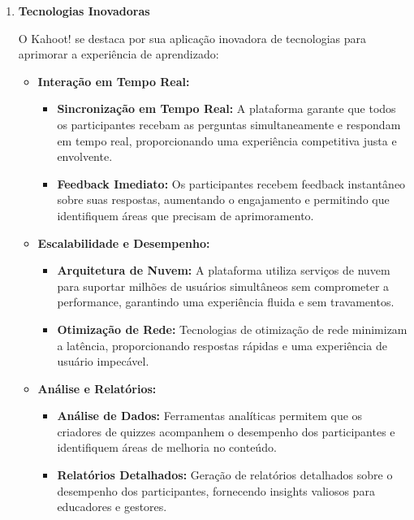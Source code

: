 \begin{enumerate}
    \item \textbf{Tecnologias Inovadoras}
    
    O Kahoot! se destaca por sua aplicação inovadora de tecnologias para aprimorar a experiência de aprendizado:

    \begin{itemize}
        \item \textbf{Interação em Tempo Real:}
        \begin{itemize}
            \item \textbf{Sincronização em Tempo Real:} A plataforma garante que todos os participantes recebam as perguntas simultaneamente e respondam em tempo real, proporcionando uma experiência competitiva justa e envolvente.
            \item \textbf{Feedback Imediato:} Os participantes recebem feedback instantâneo sobre suas respostas, aumentando o engajamento e permitindo que identifiquem áreas que precisam de aprimoramento.
        \end{itemize}
        
        \item \textbf{Escalabilidade e Desempenho:}
        \begin{itemize}
            \item \textbf{Arquitetura de Nuvem:} A plataforma utiliza serviços de nuvem para suportar milhões de usuários simultâneos sem comprometer a performance, garantindo uma experiência fluida e sem travamentos.
            \item \textbf{Otimização de Rede:} Tecnologias de otimização de rede minimizam a latência, proporcionando respostas rápidas e uma experiência de usuário impecável.
        \end{itemize}

        \item \textbf{Análise e Relatórios:}
        \begin{itemize}
            \item \textbf{Análise de Dados:} Ferramentas analíticas permitem que os criadores de quizzes acompanhem o desempenho dos participantes e identifiquem áreas de melhoria no conteúdo.
            \item \textbf{Relatórios Detalhados:} Geração de relatórios detalhados sobre o desempenho dos participantes, fornecendo insights valiosos para educadores e gestores.
        \end{itemize}
    \end{itemize}


\end{enumerate}

